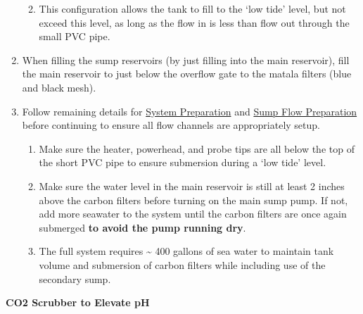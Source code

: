 \documentclass[
]{book}
\providecommand{\tightlist}{%
  \setlength{\itemsep}{0pt}\setlength{\parskip}{0pt}}
\begin{document}
\begin{enumerate}
  \begin{enumerate}
  \def\labelenumii{\arabic{enumii}.}
  \tightlist
  \item
    This configuration allows the tank to fill to the `low tide' level, but not exceed this level, as long as the flow in is less than flow out through the small PVC pipe.
  \end{enumerate}
\item
  When filling the sump reservoirs (by just filling into the main reservoir), fill the main reservoir to just below the overflow gate to the matala filters (blue and black mesh).
\item
  Follow remaining details for \protect\hyperlink{Preparation}{System Preparation} and \protect\hyperlink{Sump_Flow}{Sump Flow Preparation} before continuing to ensure all flow channels are appropriately setup.

  \begin{enumerate}
  \def\labelenumii{\arabic{enumii}.}
  \tightlist
  \item
    Make sure the heater, powerhead, and probe tips are all below the top of the short PVC pipe to ensure submersion during a `low tide' level.
  \item
    Make sure the water level in the main reservoir is still at least 2 inches above the carbon filters before turning on the main sump pump. If not, add more seawater to the system until the carbon filters are once again submerged \textbf{to avoid the pump running dry}.
  \item
    The full system requires \textasciitilde{} 400 gallons of sea water to maintain tank volume and submersion of carbon filters while including use of the secondary sump.
  \end{enumerate}
\end{enumerate}

\textbf{CO2 Scrubber to Elevate pH}
\end{document}
